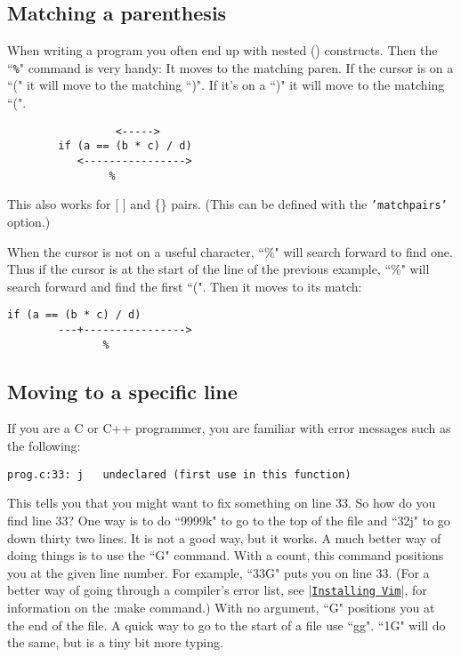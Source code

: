 \subsection{Matching a parenthesis}

When writing a program you often end up with nested () constructs.
Then the ``\texttt{\%}" command is very handy: It moves to the matching paren.
If the cursor is on a ``(" it will move to the matching ``)".
If it's on a ``)" it will move to the matching ``(".

\begin{Verbatim}[samepage=true]
                   %
                 <----->
        if (a == (b * c) / d) 
           <---------------->
                %
\end{Verbatim}

This also works for [ ] and \{\} pairs.
(This can be defined with the \texttt{'matchpairs'} option.)

When the cursor is not on a useful character, ``\%" will search forward to find one.
Thus if the cursor is at the start of the line of the previous example, ``\%" will search forward and find the first ``(".
Then it moves to its match:

\begin{Verbatim}[samepage=true]
        if (a == (b * c) / d) 
        ---+---------------->
               %
\end{Verbatim}


\subsection{Moving to a specific line}

If you are a C or C++ programmer, you are familiar with error messages such as the following:

		\begin{Verbatim}[samepage=true]
    prog.c:33: j   undeclared (first use in this function) 
		\end{Verbatim}

This tells you that you might want to fix something on line 33.
So how do you find line 33?  One way is to do ``9999k" to go to the top of the file and ``32j" to go down thirty two lines.
It is not a good way, but it works.
A much better way of doing things is to use the ``G" command.
With a count, this command positions you at the given line number.
For example, ``33G" puts you on line 33.
(For a better way of going through a compiler's error list, see |\hyperref[Installing Vim]{\texttt{Installing Vim}}|, for information on the :make command.) With no argument, ``G" positions you at the end of the file.
A quick way to go to the start of a file use ``gg".
``1G" will do the same, but is a tiny bit more typing.
 
